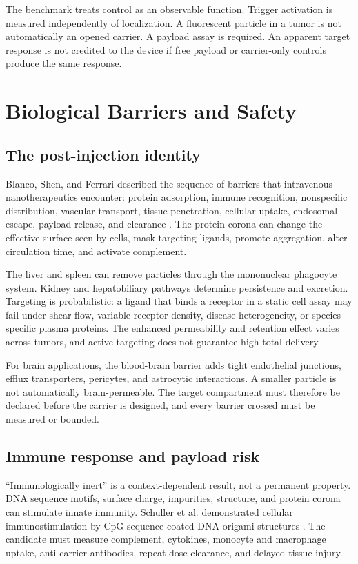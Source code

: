 \documentclass[conference]{IEEEtran}
\begin{document}
The benchmark treats control as an observable function. Trigger activation is measured independently of localization. A fluorescent particle in a tumor is not automatically an opened carrier. A payload assay is required. An apparent target response is not credited to the device if free payload or carrier-only controls produce the same response.

\section{Biological Barriers and Safety}
\label{sec:barriers}
\subsection{The post-injection identity}
Blanco, Shen, and Ferrari described the sequence of barriers that intravenous nanotherapeutics encounter: protein adsorption, immune recognition, nonspecific distribution, vascular transport, tissue penetration, cellular uptake, endosomal escape, payload release, and clearance \cite{blanco2015}. The protein corona can change the effective surface seen by cells, mask targeting ligands, promote aggregation, alter circulation time, and activate complement.

The liver and spleen can remove particles through the mononuclear phagocyte system. Kidney and hepatobiliary pathways determine persistence and excretion. Targeting is probabilistic: a ligand that binds a receptor in a static cell assay may fail under shear flow, variable receptor density, disease heterogeneity, or species-specific plasma proteins. The enhanced permeability and retention effect varies across tumors, and active targeting does not guarantee high total delivery.

For brain applications, the blood-brain barrier adds tight endothelial junctions, efflux transporters, pericytes, and astrocytic interactions. A smaller particle is not automatically brain-permeable. The target compartment must therefore be declared before the carrier is designed, and every barrier crossed must be measured or bounded.

\subsection{Immune response and payload risk}
``Immunologically inert'' is a context-dependent result, not a permanent property. DNA sequence motifs, surface charge, impurities, structure, and protein corona can stimulate innate immunity. Schuller et al. demonstrated cellular immunostimulation by CpG-sequence-coated DNA origami structures \cite{schuller2011}. The candidate must measure complement, cytokines, monocyte and macrophage uptake, anti-carrier antibodies, repeat-dose clearance, and delayed tissue injury.
\end{document}
